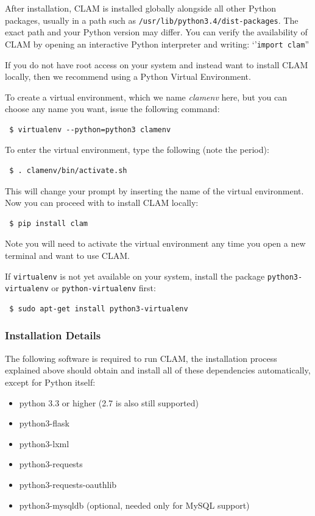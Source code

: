 \documentclass[a4paper,12pt,twoside,openright]{report}
\begin{document}
After installation, CLAM is installed globally alongside all other Python
packages, usually in a path such as \texttt{/usr/lib/python3.4/dist-packages}.
The exact path and your Python version may differ. You can verify the
availability of CLAM by opening an interactive Python interpreter and writing:
`'\texttt{import clam}''

If you do not have root access on your system and instead want to install CLAM
locally, then we recommend using a Python Virtual Environment.

To create a virtual environment, which we name \emph{clamenv} here, but you can
choose any name you want, issue the following command:

{ \small
\begin{verbatim} $ virtualenv --python=python3 clamenv \end{verbatim}
}

To enter the virtual environment, type the following (note the period):

{ \small
\begin{verbatim} $ . clamenv/bin/activate.sh \end{verbatim}
}

This will change your prompt by inserting the name of the virtual environment.
Now you can proceed with to install CLAM locally:

{ \small
\begin{verbatim} $ pip install clam \end{verbatim}
}

Note you will need to activate the virtual environment any time you open a new
terminal and want to use CLAM. 

If \texttt{virtualenv} is not yet available on your system, install the package
\texttt{python3-virtualenv} or \texttt{python-virtualenv} first:

{ \small
\begin{verbatim} $ sudo apt-get install python3-virtualenv \end{verbatim}
}

\subsubsection{Installation Details} 
 
The following software is required to run CLAM, the installation process
explained above should obtain and install all of these dependencies
automatically, except for Python itself:

\begin{itemize}
\item python 3.3 or higher    (2.7 is also still supported)
\item python3-flask
\item python3-lxml
\item python3-requests 
\item python3-requests-oauthlib 
\item python3-mysqldb (optional, needed only for MySQL support)
\end{itemize}
\end{document}
